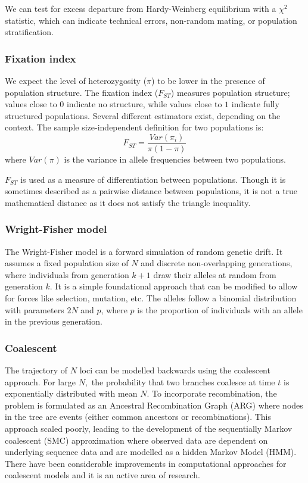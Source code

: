 We can test for excess departure from Hardy-Weinberg equilibrium with a $\chi^2$ statistic, which can indicate technical errors, non-random mating, or population stratification.

\subsubsection{Fixation index}

We expect the level of heterozygosity ($\pi$) to be lower in the presence of population structure. The fixation index ($F_{ST}$) measures population structure; values close to $0$ indicate no structure, while values close to $1$ indicate fully structured populations. Several different estimators exist, depending on the context\citep{bhatia_estimating_2013}. The sample size-independent definition for two populations is: $$ F_{ST} = \frac{Var(\pi_{i})}{\pi(1-\pi)} $$ where $Var(\pi)$ is the variance in allele frequencies between two populations.

$F_{ST}$ is used as a measure of differentiation between populations. Though it is sometimes described as a pairwise distance between populations, it is not a true mathematical distance as it does not satisfy the triangle inequality\citep{arbisser_fst_2020}.

\subsubsection{Wright-Fisher model}

The Wright-Fisher model is a forward simulation of random genetic drift\citep{hartl2007principles_3}. It assumes a fixed population size of $N$ and discrete non-overlapping generations, where individuals from generation $k+1$ draw their alleles at random from generation $k$. It is a simple foundational approach that can be modified to allow for forces like selection, mutation, etc. The alleles follow a binomial distribution with parameters $2N$ and $p$, where $p$ is the proportion of individuals with an allele in the previous generation.

\subsubsection{Coalescent}

The trajectory of $N$ loci can be modelled backwards using the coalescent approach\citep{hartl2007principles_3}. For large $N,$ the probability that two branches coalesce at time $t$ is exponentially distributed with mean $N$. To incorporate recombination, the problem is formulated as an Ancestral Recombination Graph (ARG) where nodes in the tree are events (either common ancestors or recombinations). This approach scaled poorly, leading to the development of the sequentially Markov coalescent (SMC) approximation where observed data are dependent on underlying sequence data and are modelled as a hidden Markov Model (HMM). There have been considerable improvements in computational approaches for coalescent models and it is an active area of research\citep{kelleher2019inferring,yc2022evaluation,zhang2023biobank}.

